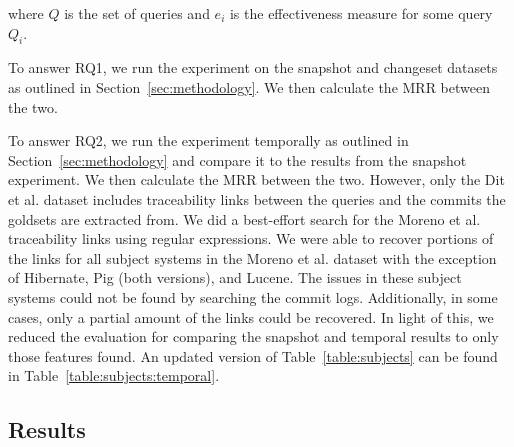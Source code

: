 where $Q$ is the set of queries
and $e_i$ is the effectiveness measure for some query $Q_i$.

To answer RQ1, we run the experiment on the snapshot and changeset
datasets as outlined in Section~\ref{sec:methodology}.
We then calculate the MRR between the two.

To answer RQ2, we run the experiment temporally as outlined in Section~\ref{sec:methodology}
and compare it to the results from the snapshot experiment.
We then calculate the MRR between the two.
However, only the Dit et al. dataset includes traceability links between
the queries and the commits the goldsets are extracted from.
We did a best-effort search for the Moreno et al. traceability links
using regular expressions.
We were able to recover portions of the links for all subject systems in
the Moreno et al. dataset with the exception of Hibernate, Pig (both versions), and Lucene.
The issues in these subject systems could not be found by searching the commit logs.
Additionally, in some cases, only a partial amount of the links could be
recovered. In light of this, we reduced the evaluation for comparing the
snapshot and temporal results to only those features found.
An updated version of Table~\ref{table:subjects} can be found in Table~\ref{table:subjects:temporal}.


\subsection{Results}


